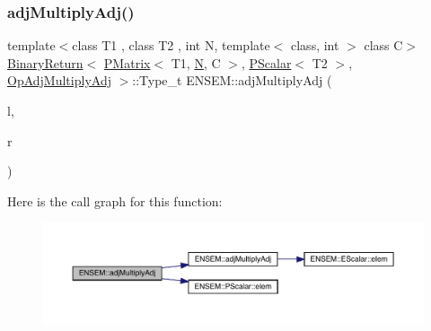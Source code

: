 \subsubsection{\texorpdfstring{adjMultiplyAdj()}{adjMultiplyAdj()}\hspace{0.1cm}{\footnotesize\ttfamily [1/3]}}
{\footnotesize\ttfamily template$<$class T1 , class T2 , int N, template$<$ class, int $>$ class C$>$ \\
\mbox{\hyperlink{structENSEM_1_1BinaryReturn}{Binary\+Return}}$<$ \mbox{\hyperlink{classENSEM_1_1PMatrix}{P\+Matrix}}$<$ T1, \mbox{\hyperlink{operator__name__util_8cc_a7722c8ecbb62d99aee7ce68b1752f337}{N}}, C $>$, \mbox{\hyperlink{classENSEM_1_1PScalar}{P\+Scalar}}$<$ T2 $>$, \mbox{\hyperlink{structENSEM_1_1OpAdjMultiplyAdj}{Op\+Adj\+Multiply\+Adj}} $>$\+::Type\+\_\+t E\+N\+S\+E\+M\+::adj\+Multiply\+Adj (\begin{DoxyParamCaption}\item[{const \mbox{\hyperlink{classENSEM_1_1PMatrix}{P\+Matrix}}$<$ T1, \mbox{\hyperlink{operator__name__util_8cc_a7722c8ecbb62d99aee7ce68b1752f337}{N}}, C $>$ \&}]{l,  }\item[{const \mbox{\hyperlink{classENSEM_1_1PScalar}{P\+Scalar}}$<$ T2 $>$ \&}]{r }\end{DoxyParamCaption})\hspace{0.3cm}{\ttfamily [inline]}}

Here is the call graph for this function\+:\nopagebreak
\begin{figure}[H]
\begin{center}
\leavevmode
\includegraphics[width=350pt]{df/d0a/group__primmatrix_gada4da32758440b83d445ae4a0e14297e_cgraph}
\end{center}
\end{figure}
\mbox{\label{group__primmatrix_ga5b52c2e633a016e706b74e388b8af102}} 
